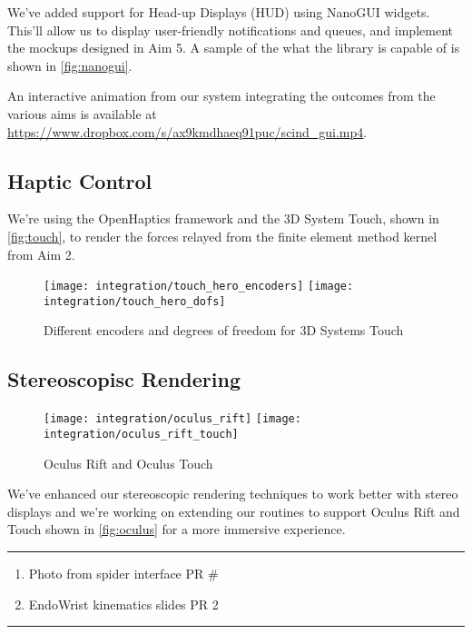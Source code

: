We've added support for Head-up Displays (HUD) using NanoGUI widgets. This'll allow us to display user-friendly notifications and queues, and implement the mockups designed in Aim 5. A sample of the what the library is capable of is shown in \autoref{fig:nanogui}.

An interactive animation from our system integrating the outcomes from the various aims is available at \url{https://www.dropbox.com/s/ax9kmdhaeq91puc/scind_gui.mp4}.

\subsection{Haptic Control}\label{ssec:haptic}
We're using the OpenHaptics framework and the 3D System Touch, shown in \autoref{fig:touch}, to render the forces relayed from the finite element method kernel from Aim 2.

\begin{figure}
  \centering%
  \texttt{[image: integration/touch\_hero\_encoders]}
  \hfill%
  \texttt{[image: integration/touch\_hero\_dofs]}
  \caption{Different encoders and degrees of freedom for 3D Systems Touch}\label{fig:touch}
\end{figure}

\subsection{Stereoscopisc Rendering}\label{ssec:stereo}
\begin{figure}
  \centering%
  \texttt{[image: integration/oculus\_rift]}
  \hfill%
  \texttt{[image: integration/oculus\_rift\_touch]}
  \caption{Oculus Rift and Oculus Touch}\label{fig:oculus}
\end{figure}

We've enhanced our stereoscopic rendering techniques to work better with stereo displays and we're working on extending our routines to support Oculus Rift and Touch shown in \autoref{fig:oculus} for a more immersive experience.

\hrule%

\begin{enumerate}
  \item Photo from spider interface PR #
  \item EndoWrist kinematics slides PR 2
\end{enumerate}

\hrule%


